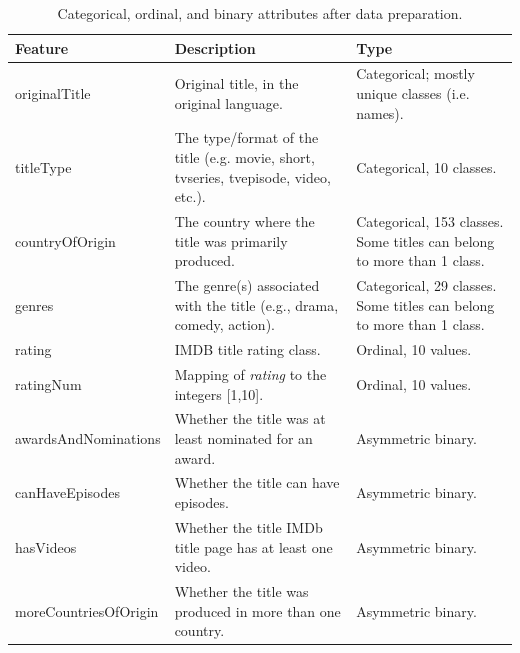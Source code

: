 \begin{table}
    \centering
    \renewcommand{\arraystretch}{1.2}
    \scriptsize
    \begin{tabular}{p{2.5cm}p{7cm}p{4.5cm}}
    \toprule
    \textbf{Feature} & \textbf{Description} & \textbf{Type} \\ \midrule
    originalTitle & Original title, in the original language. & Categorical; mostly unique classes (i.e. names). \\
    titleType & The type/format of the title (e.g. movie, short, tvseries, tvepisode, video, etc.). & Categorical, 10 classes. \\
    countryOfOrigin & The country where the title was primarily produced. & Categorical, 153 classes. Some titles can belong to more than 1 class. \\
    genres & The genre(s) associated with the title (e.g., drama, comedy, action). & Categorical, 29 classes. Some titles can belong to more than 1 class. \\
    rating & IMDB title rating class. & Ordinal, 10 values. \\
    ratingNum & Mapping of \textit{rating} to the integers [1,10]. & Ordinal, 10 values. \\
    awardsAndNominations & Whether the title was at least nominated for an award. & Asymmetric binary. \\
    canHaveEpisodes & Whether the title can have episodes. & Asymmetric binary. \\
    hasVideos & Whether the title IMDb title page has at least one video. & Asymmetric binary. \\
    moreCountriesOfOrigin & Whether the title was produced in more than one country. & Asymmetric binary.\\ \bottomrule
    \end{tabular}
    \caption{Categorical, ordinal, and binary attributes after data preparation.}
    \label{tab:dataset_categorical}
\end{table}
